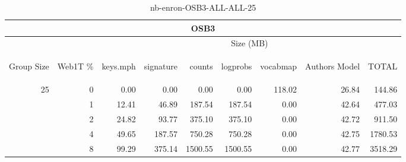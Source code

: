 \begin{center}
\begin{table}[htbp]
\begin{tabular}{ | r | r | r | r | r | r | r | r | r |}
\hline
\multicolumn{9}{|c|}{OSB3}\\
\hline
 & & \multicolumn{7}{|c|}{Size (MB)}\\ \cline{3-9}
\begin{sideways}Group Size\end{sideways} & \begin{sideways}Web1T \% \end{sideways} & \begin{sideways}keys.mph\end{sideways} & \begin{sideways}signature\end{sideways} & \begin{sideways}counts\end{sideways} & \begin{sideways}logprobs\end{sideways} & \begin{sideways}vocabmap\end{sideways} & \begin{sideways}Authors Model \end{sideways} & \begin{sideways}TOTAL\end{sideways}\\
\hline
\multirow{4}{*}{25}
 & 0 & 0.00 & 0.00 & 0.00 & 0.00 & 118.02 & 26.84 & 144.86\\ \cline{2-9}
 & 1 & 12.41 & 46.89 & 187.54 & 187.54 & 0.00 & 42.64 & 477.03\\ \cline{2-9}
 & 2 & 24.82 & 93.77 & 375.10 & 375.10 & 0.00 & 42.72 & 911.50\\ \cline{2-9}
 & 4 & 49.65 & 187.57 & 750.28 & 750.28 & 0.00 & 42.75 & 1780.53\\ \cline{2-9}
 & 8 & 99.29 & 375.14 & 1500.55 & 1500.55 & 0.00 & 42.77 & 3518.29\\ \cline{2-9}
\hline
\end{tabular}
\caption{nb-enron-OSB3-ALL-ALL-25}
\label{table:nb-enron-OSB3-ALL-ALL-25}
\end{table}
\end{center}

